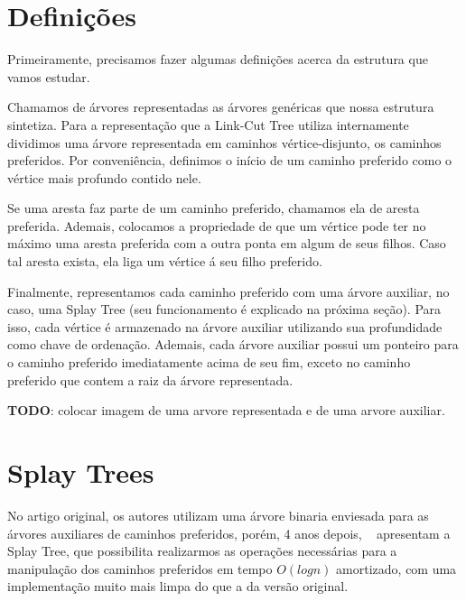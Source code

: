 \section{Definições}
\label{sec:lct-definicoes}

Primeiramente, precisamos fazer algumas definições acerca da estrutura que vamos estudar.

Chamamos de árvores representadas as árvores genéricas que nossa estrutura sintetiza. Para a representação que a Link-Cut Tree utiliza internamente dividimos uma árvore representada em caminhos vértice-disjunto, os caminhos preferidos. Por conveniência, definimos o início de um caminho preferido como o vértice mais profundo contido nele.

Se uma aresta faz parte de um caminho preferido, chamamos ela de aresta preferida. Ademais, colocamos a propriedade de que um vértice pode ter no máximo uma aresta preferida com a outra ponta em algum de seus filhos. Caso tal aresta exista, ela liga um vértice á seu filho preferido.

Finalmente, representamos cada caminho preferido com uma árvore auxiliar, no caso, uma Splay Tree (seu funcionamento é explicado na próxima seção). Para isso, cada vértice é armazenado na árvore auxiliar utilizando sua profundidade como chave de ordenação. Ademais, cada árvore auxiliar possui um ponteiro para o caminho preferido imediatamente acima de seu fim, exceto no caminho preferido que contem a raiz da árvore representada.

\begin{center}
    \textbf{TODO}: colocar imagem de uma arvore representada e de uma arvore auxiliar.
\end{center}

\section{Splay Trees}
\label{sec:lct-splay-trees}

No artigo original, os autores utilizam uma árvore binaria enviesada para as árvores auxiliares de caminhos preferidos, porém, 4 anos depois, ~\citet{10.1145/3828.3835} apresentam a Splay Tree, que possibilita realizarmos as operações necessárias para a manipulação dos caminhos preferidos em tempo $O(logn)$ amortizado, com uma implementação muito mais limpa do que a da versão original.

